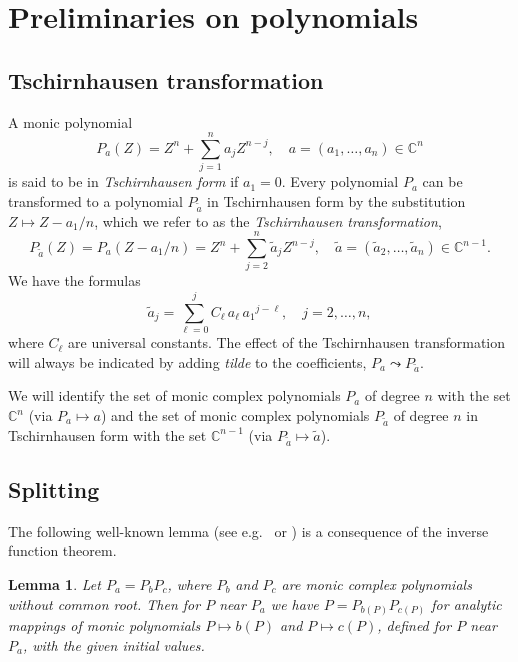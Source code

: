 \documentclass[12pt]{amsart}
\theoremstyle{plain}
\newtheorem{lemma}{Lemma}
\theoremstyle{definition}
\numberwithin{equation}{section}
\begin{document}
\section{Preliminaries on polynomials} \label{polynomials}

\subsection{Tschirnhausen transformation}

A monic polynomial 
\[
  P_a(Z) = Z^n + \sum_{j=1}^n a_j Z^{n-j}, \quad a=(a_1,\ldots,a_n) \in {\mathbb{C}}^n
\] 
is said to be in \emph{Tschirnhausen form} if $a_1=0$.
Every polynomial $P_a$ can be transformed to a polynomial $P_{\tilde a}$ in Tschirnhausen form 
by the substitution $Z \mapsto Z-a_1/n$, which we refer to as the 
\emph{Tschirnhausen transformation}, 
\[
  P_{\tilde a}(Z) = P_a(Z-a_1/n) = Z^n + \sum_{j=2}^n \tilde a_j Z^{n-j}, \quad \tilde a=(\tilde a_2,\ldots,\tilde a_n) \in {\mathbb{C}}^{n-1}.
\]
We have the formulas
\begin{equation}\label{Tschirnhausen}
  \tilde a_j = \sum_{\ell=0}^j C_\ell\, a_\ell\, {a_1}^{j-\ell}, \quad j= 2,\ldots,n, 
\end{equation} 
where $C_\ell$ are universal constants.
The effect of the Tschirnhausen transformation will always be indicated by adding \emph{tilde} to the coefficients, $P_a \leadsto P_{\tilde a}$.  

We will identify the set of monic complex polynomials $P_a$ of degree $n$ with the set ${\mathbb{C}}^n$ (via $P_a \mapsto a$) and 
the set of monic complex polynomials $P_{\tilde a}$ of degree $n$ in Tschirnhausen form 
with the set ${\mathbb{C}}^{n-1}$ (via $P_{\tilde a} \mapsto \tilde a$).

\subsection{Splitting} \label{ssec:split}

The following well-known lemma (see e.g.\ \cite{AKLM98} or \cite{BM90}) is a consequence of the 
inverse function theorem. 

\begin{lemma} \label{split}
Let $P_a = P_b P_c$, where $P_b$ and $P_c$ are monic complex polynomials without common root.
Then for $P$ near $P_a$ we have $P = P_{b(P)} P_{c(P)}$
for analytic mappings of monic polynomials $P \mapsto b(P)$ and $P \mapsto c(P)$,
defined for $P$ near $P_a$, with the given initial values.
\end{lemma}
\end{document}
